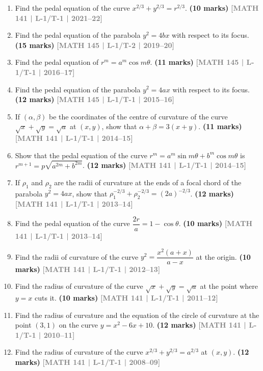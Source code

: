 \documentclass[12pt,a4paper]{article}
\newcommand{\yr}[1]{\hfill\textcolor{gray}{\small\textbf{[#1]}}}
\newcommand{\mk}[1]{\textcolor{orange!70!black}{\small\textbf{(#1 marks)}}}
\begin{document}
\begin{enumerate}\item Find the pedal equation of the curve $x^{2/3}+y^{2/3}=r^{2/3}$.
\mk{10} \yr{MATH 141 | L-1/T-1 | 2021--22}


\item Find the pedal equation of the parabola $y^{2}=4bx$ with respect to its focus.
\mk{15} \yr{MATH 145 | L-1/T-2 | 2019--20}

\item Find the pedal equation of $r^{m}=a^{m}\cos m\theta$.
\mk{11} \yr{MATH 145 | L-1/T-1 | 2016--17}

\item Find the pedal equation of the parabola $y^{2}=4ax$ with respect to its focus.
\mk{12} \yr{MATH 145 | L-1/T-1 | 2015--16}

\item If $(\alpha,\beta)$ be the coordinates of the centre of curvature of the curve $\sqrt{x}+\sqrt{y}=\sqrt{a}$ at $(x,y)$, show that $\alpha+\beta=3(x+y)$.
\mk{11} \yr{MATH 141 | L-1/T-1 | 2014--15}

\item Show that the pedal equation of the curve $r^{m}=a^{m}\sin m\theta+b^{m}\cos m\theta$ is $r^{m+1}=p\sqrt{a^{2m}+b^{2m}}$.
\mk{12} \yr{MATH 141 | L-1/T-1 | 2014--15}

\item If $\rho_{1}$ and $\rho_{2}$ are the radii of curvature at the ends of a focal chord of the parabola $y^{2}=4ax$, show that $\rho_{1}^{-2/3}+\rho_{2}^{-2/3}=(2a)^{-2/3}$.
\mk{12} \yr{MATH 141 | L-1/T-1 | 2013--14}

\item Find the pedal equation of the curve $\dfrac{2r}{a}=1-\cos\theta$.
\mk{10} \yr{MATH 141 | L-1/T-1 | 2013--14}

\item Find the radii of curvature of the curve $y^{2}=\dfrac{x^{2}(a+x)}{a-x}$ at the origin.
\mk{10} \yr{MATH 141 | L-1/T-1 | 2012--13}

\item Find the radius of curvature of the curve $\sqrt{x}+\sqrt{y}=\sqrt{a}$ at the point where $y=x$ cuts it.
\mk{10} \yr{MATH 141 | L-1/T-1 | 2011--12}

\item Find the radius of curvature and the equation of the circle of curvature at the point $(3,1)$ on the curve $y=x^{2}-6x+10$.
\mk{12} \yr{MATH 141 | L-1/T-1 | 2010--11}

\item Find the radius of curvature of the curve $x^{2/3}+y^{2/3}=a^{2/3}$ at $(x,y)$.
\mk{12} \yr{MATH 141 | L-1/T-1 | 2008--09}


\end{enumerate}
\end{document}
